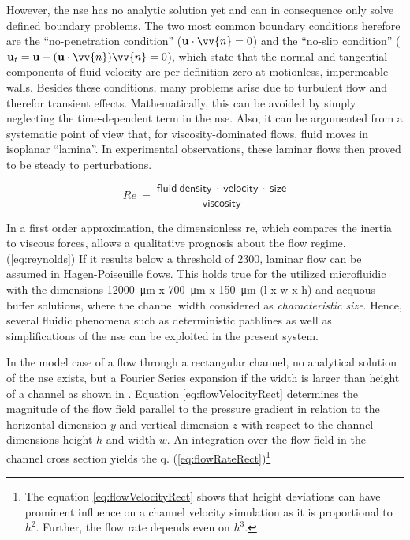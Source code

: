 However, the \gls{nse} has no analytic solution yet and can in consequence only solve defined boundary problems. The two most common boundary conditions herefore are the ``no-penetration condition'' ($\mathbf{u} \cdot \vv{n} = 0$) and the ``no-slip condition'' ($\mathbf{u}_t = \mathbf{u} - (\mathbf{u}\cdot \vv{n}) \vv{n} = 0$), which state that the normal and tangential components of fluid velocity are per definition zero at motionless, impermeable walls.\newline
Besides these conditions, many problems arise due to turbulent flow and therefor transient effects. Mathematically, this can be avoided by simply neglecting the time-dependent term in the \gls{nse}. Also, it can be argumented from a systematic point of view that, for viscosity-dominated flows, fluid moves in isoplanar ``lamina''. In experimental observations, these laminar flows then proved to be steady to perturbations.

\begin{equation}
	\mathit{Re}\ =\ \frac{\mathrm{\mathsf{fluid\ density\ \cdot\ velocity\ \cdot\ size}}}{\mathrm{\mathsf{viscosity}}} \label{eq:reynolds}
\end{equation}

In a first order approximation, the dimensionless \gls{re}, which compares the inertia to viscous forces, allows a qualitative prognosis about the flow regime. (\cref{eq:reynolds}) If it results below a threshold of 2300, laminar flow can be assumed in Hagen-Poiseuille flows. This holds true for the utilized microfluidic with the dimensions \SI{12000}{\micro\meter} x \SI{700}{\micro\meter} x \SI{150}{\micro\meter} (l x w x h) and aequous buffer solutions, where the channel width considered as \textit{characteristic size}. Hence, several fluidic phenomena such as deterministic pathlines as well as simplifications of the \gls{nse} can be exploited in the present system. 

In the model case of a flow through a rectangular channel, no analytical solution of the \gls{nse} exists, but a Fourier Series expansion if the width is larger than height of a channel as shown in \citet{lit:fluidic:bruus}. Equation \cref{eq:flowVelocityRect} determines the magnitude of the flow field parallel to the pressure gradient in relation to the horizontal dimension $y$ and vertical dimension $z$ with respect to the channel dimensions height $h$ and width $w$. An integration over the flow field in the channel cross section yields the \gls{q}. (\cref{eq:flowRateRect})\footnote{The equation \cref{eq:flowVelocityRect} shows that height deviations can have prominent influence on a channel velocity simulation as it is proportional to $h^2$. Further, the flow rate depends even on $h^3$.} 

